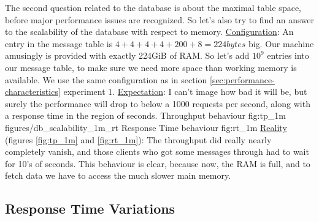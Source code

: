 \documentclass[11pt]{article}
\begin{document}
The second question related to the database is about the maximal table space, before major performance issues are recognized. So let's also try to find an answer to the scalability of the database with respect to memory.
\newline\underline{Configuration}: An entry in the message table is $4+4+4+4+200+8=224bytes$ big. Our machine amusingly is provided with exactly 224GiB of RAM. So let's add $10^9$ entries into our message table, to make sure we need more space than working memory is available. We use the same configuration as in section \ref{sec:performance-characteristics} experiment 1.
\newline\underline{Expectation}: I can't image how bad it will be, but surely the performance will drop to below a 1000 requests per second, along with a response time in the region of seconds.
 {Throughput behaviour} {fig:tp_1m}
		{figures/db_scalability_1m_rt} {Response Time behaviour} {fig:rt_1m}
\newline\underline{Reality} (figures \ref{fig:tp_1m} and \ref{fig:rt_1m}): The throughput did really nearly completely vanish, and those clients who got some messages through had to wait for 10's of seconds. This behaviour is clear, because now, the RAM is full, and to fetch data we have to access the much slower main memory.

\subsection{Response Time Variations}\label{sec:response-time-variations}
\end{document}
